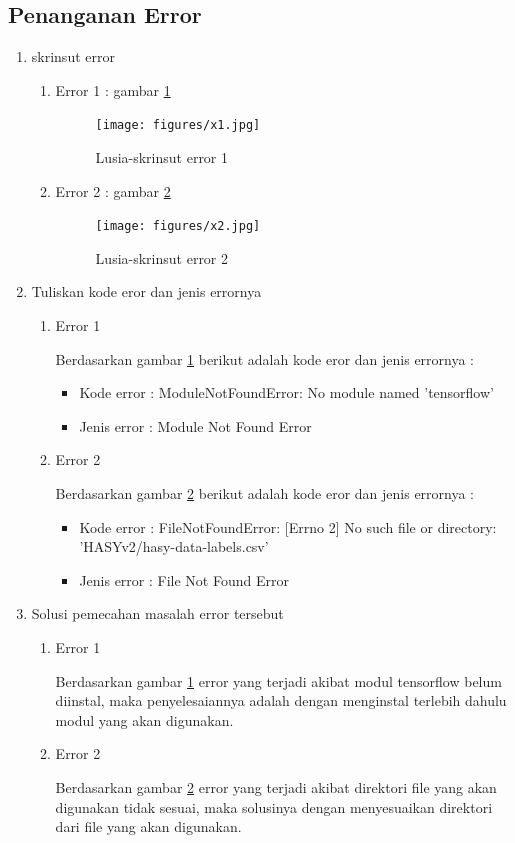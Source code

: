 \subsection{Penanganan Error}
\begin{enumerate}
	\item skrinsut error 
		\begin{enumerate}
		\item Error 1 : gambar \ref{7C1}
		\begin{figure}[!hbtp]
		\centering
		\texttt{[image: figures/x1.jpg]}
		\caption{Lusia-skrinsut error 1}
		\label{7C1}
		\end{figure}
		\item Error 2 : gambar \ref{7C2}
		\begin{figure}[!hbtp]
		\centering
		\texttt{[image: figures/x2.jpg]}
		\caption{Lusia-skrinsut error 2}
		\label{7C2}
		\end{figure}
		\end{enumerate}
	\item Tuliskan kode eror dan jenis errornya
		\begin{enumerate}
		\item Error 1
			\par Berdasarkan gambar \ref{7C1} berikut adalah kode eror dan jenis errornya :
			\begin{itemize}
			\item Kode error : ModuleNotFoundError: No module named 'tensorflow'
			\item Jenis error : Module Not Found Error
			\end{itemize}
		\item Error 2
			\par Berdasarkan gambar \ref{7C2} berikut adalah kode eror dan jenis errornya :
			\begin{itemize}
			\item Kode error : FileNotFoundError: [Errno 2] No such file or directory: 'HASYv2/hasy-data-labels.csv'
			\item Jenis error : File Not Found Error
			\end{itemize}
		\end{enumerate}
	\item Solusi pemecahan masalah error tersebut
		\begin{enumerate}
		\item Error 1
			\par Berdasarkan gambar \ref{7C1} error yang terjadi akibat modul tensorflow belum diinstal, maka penyelesaiannya adalah dengan menginstal terlebih dahulu modul yang akan digunakan.
		\item Error 2
			\par Berdasarkan gambar \ref{7C2} error yang terjadi akibat direktori file yang akan digunakan tidak sesuai, maka solusinya dengan menyesuaikan direktori dari file yang akan digunakan.
		\end{enumerate}
\end{enumerate}

